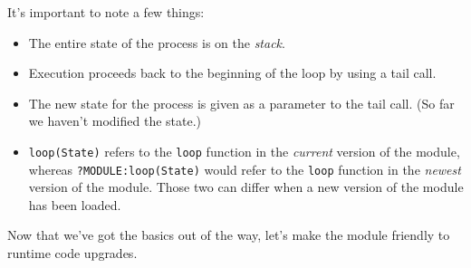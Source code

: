 \documentclass{beamer}
\begin{document}
\begin{frame}[fragile]
  It’s important to note a few things:

  \begin{itemize}
    \item The entire state of the process is on the \emph{stack}.

    \item Execution proceeds back to the beginning of the loop by using a tail
    call.

    \item The new state for the process is given as a parameter to the tail
    call.  (So far we haven’t modified the state.)

    \item \verb|loop(State)| refers to the \verb|loop| function in the
    \emph{current} version of the module, whereas \verb|?MODULE:loop(State)|
    would refer to the \verb|loop| function in the \emph{newest} version of the
    module. Those two can differ when a new version of the module has been
    loaded.
  \end{itemize}
\end{frame}

\begin{frame}[fragile]
  Now that we’ve got the basics out of the way, let’s make the module friendly
  to runtime code upgrades.
\end{frame}
\end{document}
